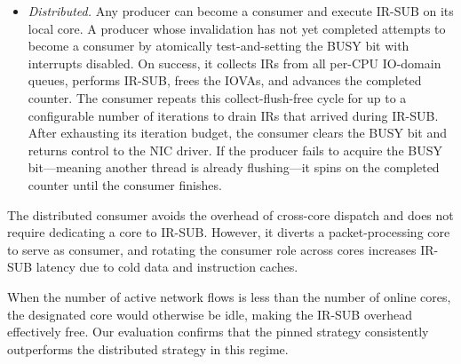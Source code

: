 \begin{itemize}[leftmargin=*]


\item \textit{Distributed.}
Any producer can become a consumer and execute IR-SUB on its local core.
A producer whose invalidation has not yet completed
attempts to become a consumer by atomically test-and-setting the BUSY bit with interrupts disabled.
On success, it collects IRs from all per-CPU IO-domain queues,
performs IR-SUB, frees the IOVAs, and advances the completed counter.
The consumer repeats this collect-flush-free cycle for up to a configurable number of iterations
to drain IRs that arrived during IR-SUB.
After exhausting its iteration budget, the consumer clears the BUSY bit 
    and returns control to the NIC driver.
If the producer fails to acquire the BUSY bit---meaning another thread
is already flushing---it spins on the completed counter until the consumer finishes.
\end{itemize}
The distributed consumer avoids the overhead of
    cross-core dispatch and does not require dedicating a core to IR-SUB.
However, it diverts a packet-processing core to serve as consumer,
and rotating the consumer role across cores increases IR-SUB latency
due to cold data and instruction caches.

When the number of active network flows is less than the number of online cores,
the designated core would otherwise be idle, making the IR-SUB overhead effectively free.
Our evaluation confirms that the pinned strategy consistently outperforms
the distributed strategy in this regime.
\fi 

